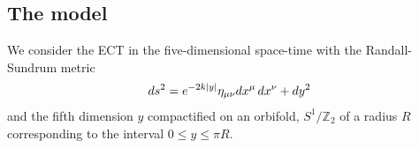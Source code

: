 \documentclass[twocolumn,showpacs,showkeys,prd,superscriptaddress]{revtex4-1}
\begin{document}
%
%


%


\subsection{The model}

We consider the ECT in the five-dimensional space-time with the Randall-Sundrum metric~\cite{Randall:1999ee}
\begin{align}
  \label{RSmetric}
  ds^2 = e^{-2k\left|y\right|}\eta_{\mu\nu}dx^\mu\,dx^\nu + dy^2
\end{align}
%
and the fifth dimension $y$ compactified on an orbifold, $S^1/\mathbb{Z}_2$ of a radius $R$ corresponding to the interval \mbox{$0\leq y\leq \pi R$}. 
\end{document}
